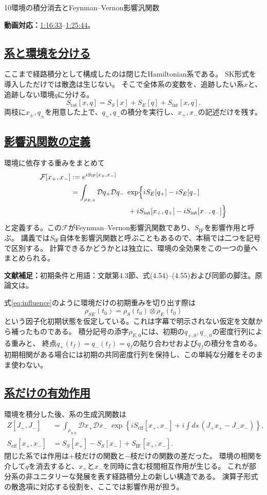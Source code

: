 \documentclass[a4paper,11pt]{ltjsarticle}
\newcommand{\subsectionlink}[1]{\subsection[#1]{\hyperlink{toc}{#1}}}
\numberwithin{equation}{section}
\newcommand{\IF}{\mathrm{IF}}
\newcommand{\video}[2]{\href{https://www.youtube.com/watch?v=RYxzcUhIHjk\&t=#1s}{#2}}
\newcommand{\videosource}[1]{\par\noindent\textcolor{noteblue}{\textbf{動画対応：}#1}\par\smallskip}
\newcommand{\supplement}[1]{\par\medskip\noindent\textcolor{notered}{\textbf{文献補足：}}#1\par\smallskip}
\begin{document}
\begin{lecturesection}{10}{環境の積分消去とFeynman--Vernon影響汎関数}
\label{sec:influence}
\videosource{\video{4593}{1:16:33}--\video{5144}{1:25:44}。}
\subsectionlink{系と環境を分ける}
ここまで経路積分として構成したのは閉じたHamiltonian系である。
SK形式を導入しただけでは散逸は生じない。
そこで全体系の変数を、追跡したい系$x$と、追跡しない環境$q$に分ける。
\begin{equation}
 S_{\mathrm{tot}}[x,q]=S_S[x]+S_E[q]+S_{\mathrm{int}}[x,q].
\end{equation}
両枝に$x_\pm,q_\pm$を用意した上で、$q_+,q_-$の積分を実行し、$x_+,x_-$の記述だけを残す。

\subsectionlink{影響汎関数の定義}
環境に依存する重みをまとめて
\begin{align}
 \mathcal F[x_+,x_-]&:=e^{iS_{\IF}[x_+,x_-]}\notag\\
 &=\int_{\rho_{E,0}}\mathcal Dq_+\mathcal Dq_-\;
 \exp\Bigl\{iS_E[q_+]-iS_E[q_-]\notag\\
 &\hspace{8em}+iS_{\mathrm{int}}[x_+,q_+]
                   -iS_{\mathrm{int}}[x_-,q_-]\Bigr\}
 \label{eq:influence}
\end{align}
と定義する。この$\mathcal F$がFeynman--Vernon影響汎関数であり、$S_{\IF}$を影響作用と呼ぶ。
講義では$S_{\IF}$自体を影響汎関数と呼ぶこともあるので、本稿では二つを記号で区別する。
計算できるかどうかとは独立に、環境の全効果をこの一つの量へまとめられる。

\supplement{初期条件と用語：文献\cite{Pajer:2026fuo}第4.3節、式(4.54)--(4.55)および同節の脚注。原論文は\cite{Feynman:1963fq}。}
式\eqref{eq:influence}のように環境だけの初期重みを切り出す際は
\begin{equation}\rho_{SE}(t_0)=\rho_S(t_0)\otimes\rho_E(t_0)
\end{equation}
という因子化初期状態を仮定している。これは字幕で明示されない仮定を文献から補ったものである。
積分記号の添字$\rho_{E,0}$には、初期の$q_{+,0},q_{-,0}$の密度行列による重みと、
終点$q_+(t_f)=q_-(t_f)=q_f$の貼り合わせおよび$q_f$の積分を含める。
初期相関がある場合には初期の共同密度行列を保持し、この単純な分離をそのまま使わない。

\subsectionlink{系だけの有効作用}
環境を積分した後、系の生成汎関数は
\begin{align}
 Z[J_+,J_-]
 &=\int_{\rho_{S,0}}\mathcal D x_+\mathcal D x_-\;
 \exp\left\{iS_{\mathrm{eff}}[x_+,x_-]
 +i\int ds\,(J_+x_+-J_-x_-)\right\},\\
 S_{\mathrm{eff}}[x_+,x_-]
 &=S_S[x_+]-S_S[x_-]+S_{\IF}[x_+,x_-].
 \label{eq:seff}
\end{align}
閉じた系では作用は$+$枝だけの関数と$-$枝だけの関数の差だった。
環境の相関を介して$q$を消去すると、$x_+$と$x_-$を同時に含む枝間相互作用が生じる。
これが部分系の非ユニタリーな発展を表す経路積分上の新しい構造である。
演算子形式の散逸項に対応する役割を、ここでは影響作用が担う。


\end{lecturesection}
\end{document}
